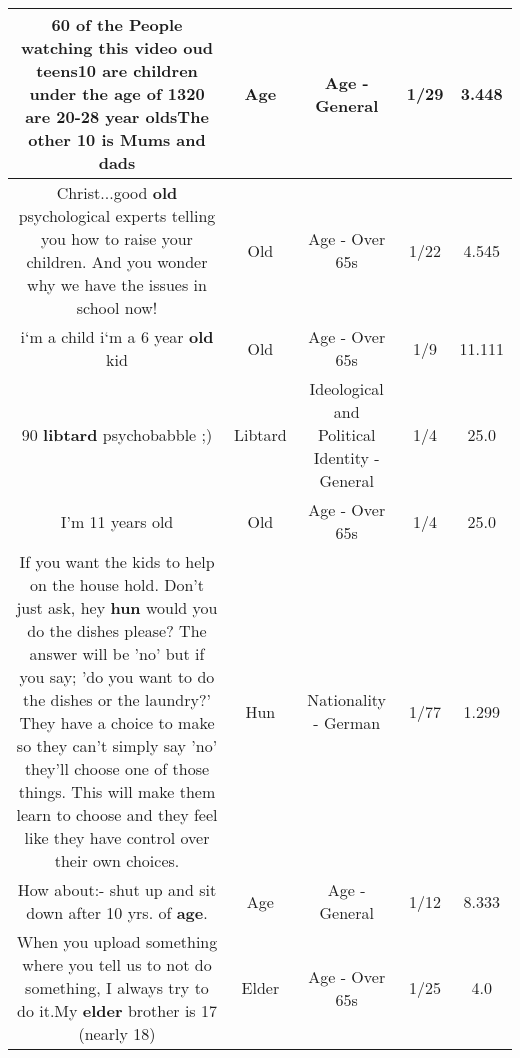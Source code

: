 \documentclass[11pt]{article}
\newlength\mylength
\begin{document}
\begin{center}
\begin{longtable}{|C{.65\mylength}|C{.30\mylength}|C{.12\mylength}|C{.12\mylength}|C{.12\mylength}|}
  \small 60 of the People watching this video oud teens10 are children under the \textbf{age} of 1320 are 20-28 year oldsThe other 10 is Mums and dads\normalsize   & Age & Age - General & 1/29 & 3.448 \\  \hline
  \small Christ...good \textbf{old} psychological experts telling you how to raise your children. And you wonder why we have the issues in school now!\normalsize   & Old & Age - Over 65s & 1/22 & 4.545 \\  \hline
  \small i`m a child i`m a 6 year \textbf{old} kid\normalsize   & Old & Age - Over 65s & 1/9 & 11.111 \\  \hline
  \small 90 \textbf{libtard} psychobabble ;)\normalsize   & Libtard &  Ideological and Political Identity - General & 1/4 & 25.0 \\  \hline
  \small I'm 11 years old\normalsize   & Old & Age - Over 65s & 1/4 & 25.0 \\  \hline
  \small If you want the kids to help on the house hold. Don't just ask, hey \textbf{hun} would you do the dishes please? The answer will be 'no' but if you say; 'do you want to do the dishes or the laundry?' They have a choice to make so they can't simply say 'no' they'll choose one of those things. This will make them learn to choose and they feel like they have control over their own choices.\normalsize   & Hun & Nationality - German & 1/77 & 1.299 \\  \hline
  \small How about:- shut up and sit down after 10 yrs. of \textbf{age}.\normalsize   & Age & Age - General & 1/12 & 8.333 \\  \hline
  \small When you upload something where you tell us to not do something, I always try to do it.My \textbf{elder} brother is 17 (nearly 18)\normalsize   & Elder & Age - Over 65s & 1/25 & 4.0 \\  \hline

\end{longtable}
\end{center}
\end{document}
